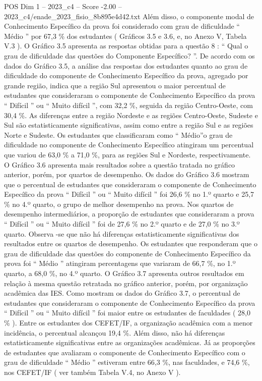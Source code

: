 \begin{textsample}{POS Dim 1 – 2023\_c4 – Score -2.00 – 2023\_c4/enade\_2023\_fisio\_8b895e4d42.txt}
Além disso, o componente modal de Conhecimento Específico da prova foi considerado com grau de dificuldade “ Médio ” por 67,3 \% dos estudantes ( Gráficos 3.5 e 3.6, e, no Anexo V, Tabela V.3 ).
O Gráfico 3.5 apresenta as respostas obtidas para a questão 8 : “ Qual o grau de dificuldade das questões do Componente Específico? ”.
De acordo com os dados do Gráfico 3.5, a análise das respostas dos estudantes quanto ao grau de dificuldade do componente de Conhecimento Específico da prova, agregado por grande região, indica que a região Sul apresentou o maior percentual de estudantes que consideraram o componente de Conhecimento Específico da prova “ Difícil ” ou “ Muito difícil ”, com 32,2 \%, seguida da região Centro-Oeste, com 30,4 \%.
As diferenças entre a região Nordeste e as regiões Centro-Oeste, Sudeste e Sul são estatisticamente significativas, assim como entre a região Sul e as regiões Norte e Sudeste.
Os estudantes que classificaram como “ Médio”o grau de dificuldade no componente de Conhecimento Específico atingiram um percentual que variou de 63,0 \% a 71,0 \%, para as regiões Sul e Nordeste, respectivamente.
O Gráfico 3.6 apresenta mais resultados sobre a questão tratada no gráfico anterior, porém, por quartos de desempenho.
Os dados do Gráfico 3.6 mostram que o percentual de estudantes que consideraram o componente de Conhecimento Específico da prova “ Difícil ” ou “ Muito difícil ” foi 26,6 \% no 1.º quarto e 25,7 \% no 4.º quarto, o grupo de melhor desempenho na prova.
Nos quartos de desempenho intermediários, a proporção de estudantes que consideraram a prova “ Difícil ” ou “ Muito difícil ” foi de 27,6 \% no 2.º quarto e de 27,0 \% no 3.º quarto.
Observa -se que não há diferenças estatisticamente significativas dos resultados entre os quartos de desempenho.
Os estudantes que responderam que o grau de dificuldade das questões do componente de Conhecimento Específico da prova foi “ Médio ” atingiram percentagens que variaram de 66,7 \%, no 1.º quarto, a 68,0 \%, no 4.º quarto.
O Gráfico 3.7 apresenta outros resultados em relação à mesma questão retratada no gráfico anterior, porém, por organização acadêmica das IES.
Como mostram os dados do Gráfico 3.7, o percentual de estudantes que consideraram o componente de Conhecimento Específico da prova “ Difícil ” ou “ Muito difícil ” foi maior entre os estudantes de faculdades ( 28,0 \% ).
Entre os estudantes dos CEFET/IF, a organização acadêmica com a menor incidência, o percentual alcançou 19,4 \%.
Além disso, não há diferenças estatisticamente significativas entre as organizações acadêmicas.
Já as proporções de estudantes que avaliaram o componente de Conhecimento Específico com o grau de dificuldade “ Médio ” estiveram entre 66,3 \%, nas faculdades, e 74,6 \%, nos CEFET/IF ( ver também Tabela V.4, no Anexo V ).

\end{textsample}

